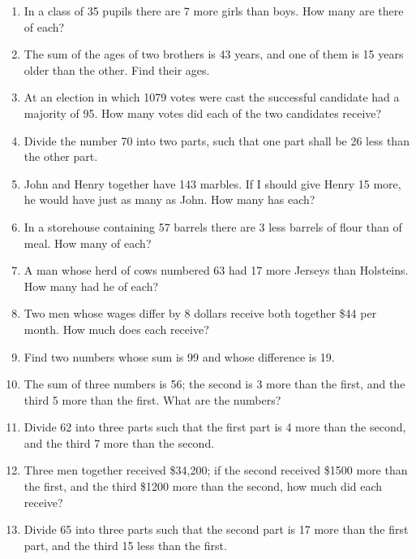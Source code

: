 \documentclass{book}
\begin{document}
\begin{enumerate}

\item In a class of 35 pupils there are 7 more girls than
boys. How many are there of each?

\item The sum of the ages of two brothers is 43 years, and
one of them is 15 years older than the other. Find their
ages.

\item At an election in which 1079 votes were cast the successful
candidate had a majority of 95. How many votes
did each of the two candidates receive?

\item Divide the number 70 into two parts, such that one
part shall be 26 less than the other part.

\item John and Henry together have 143 marbles. If I
should give Henry 15 more, he would have just as many
as John. How many has each?

\item In a storehouse containing 57 barrels there are 3
less barrels of flour than of meal. How many of each?

\item A man whose herd of cows numbered 63 had
17 more Jerseys than Holsteins. How many had he of
each?

\item Two men whose wages differ by 8 dollars receive
both together \$44 per month. How much does each
receive?

\item Find two numbers whose sum is 99 and whose difference
is 19.

\item The sum of three numbers is 56; the second is 3
more than the first, and the third 5 more than the first.
What are the numbers?

\item Divide 62 into three parts such that the first part
is 4 more than the second, and the third 7 more than the
second.

\item Three men together received \$34,200; if the second
received \$1500 more than the first, and the third \$1200
more than the second, how much did each receive?

\item Divide 65 into three parts such that the second part
is 17 more than the first part, and the third 15 less than the
first.


\end{enumerate}
\end{document}
